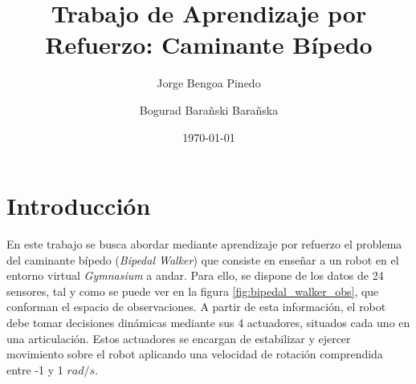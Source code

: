\documentclass[11pt,a4paper]{article}
\title{\textbf{Trabajo de Aprendizaje por Refuerzo: Caminante Bípedo}}
\author{
	Jorge Bengoa Pinedo \and
	Bogurad Barañski Barañska
}
\affil{\textbf{Máster TECI - Redes neuronales y aprendizaje estadístico}}
\date{\today}
\begin{document}
	\maketitle
	\section{Introducción}
	En este trabajo se busca abordar mediante aprendizaje por refuerzo el problema del caminante bípedo (\textit{Bipedal Walker}) que consiste en enseñar a un robot en el entorno virtual \textit{Gymnasium} a andar. Para ello, se dispone de los datos de 24 sensores, tal y como se puede ver en la figura \ref{fig:bipedal_walker_obs}, que conforman el espacio de observaciones. A partir de esta información, el robot debe tomar decisiones dinámicas mediante sus 4 actuadores, situados cada uno en una articulación. Estos actuadores se encargan de estabilizar y ejercer movimiento sobre el robot aplicando una velocidad de rotación comprendida entre -1 y 1 $rad/s$.
\end{document}
